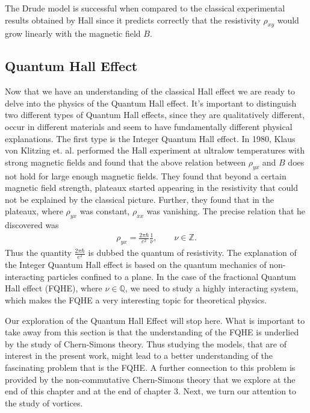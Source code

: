         The Drude model is successful when compared to the classical experimental results obtained by Hall since it predicts correctly that the resistivity  $\rho_{xy}$ would grow linearly with the magnetic field $B$.
        \subsection{Quantum Hall Effect}
        Now that we have an understanding of the classical Hall effect we are ready to delve into the physics of the Quantum Hall effect. It's important to distinguish two different types of Quantum Hall effects, since they are qualitatively different, occur in different materials and seem to have fundamentally different physical explanations.
        The first type is the Integer Quantum Hall effect. In 1980, Klaus von Klitzing et. al. \cite{vonKlitzing:1980pdk} performed the Hall experiment at ultralow temperatures with strong magnetic fields and found that the above relation between $\rho_{yx}$ and $B$ does not hold for large enough magnetic fields. They found that beyond a certain magnetic field strength, plateaux started appearing in the resistivity that could not be explained by the classical picture. Further, they found that in the plateaux, where $\rho_{yx}$ was constant, $\rho_{xx}$ was vanishing. The precise relation that he discovered was
        \begin{align}
            \rho_{yx} = \frac{2 \pi \hbar}{e^2} \frac{1}{\nu}, \qquad \nu \in \mathbb{Z}.
        \end{align}
        Thus the quantity $\frac{2 \pi \hbar}{e^2}$ is dubbed the quantum of resistivity. The explanation of the Integer Quantum Hall effect is based on the quantum mechanics of non-interacting particles confined to a plane. In the case of the fractional Quantum Hall effect (FQHE), where $\nu \in \mathbb{Q}$, we need to study a highly interacting system, which makes the FQHE a very interesting topic for theoretical physics.

        Our exploration of the Quantum Hall Effect will stop here. What is important to take away from this section is that the understanding of the FQHE is underlied by the study of Chern-Simons theory. Thus studying the models, that are of interest in the present work, might lead to a better understanding of the fascinating problem that is the FQHE. A further connection to this problem is provided by the non-commutative Chern-Simons theory that we explore at the end of this chapter and at the end of chapter 3. Next, we turn our attention to the study of vortices.

